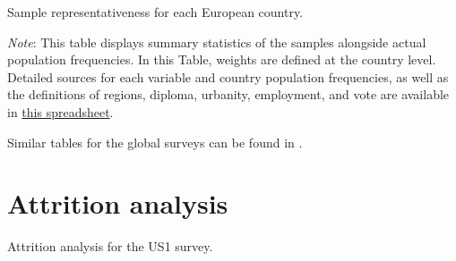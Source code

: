 \begin{table}[h]
    \caption[Sample representativeness of each European country]{Sample representativeness for each European country.} \label{tab:representativeness_EU}
    \makebox[\textwidth][c]{
        \resizebox*{!}{.50\textheight}{%
        
        }
    }
    {\footnotesize \textit{Note}: This table displays summary statistics of the samples alongside actual population frequencies. In this Table, weights are defined at the country level.  %
    Detailed sources for each variable and country population frequencies, as well as the definitions of regions, diploma, urbanity, employment, and vote are available in \href{https://github.com/bixiou/international_attitudes_toward_global_policies/raw/main/questionnaire/specificities.xlsx}{this spreadsheet}. %
    }
\end{table}

Similar tables for the global surveys can be found in \citet{dechezlepretre_fighting_2022}.

\clearpage
\section{Attrition analysis}\label{app:attrition}

\begin{table}[h]\label{tab:attrition_US1}
    \caption[Attrition analysis: US1]{Attrition analysis for the US1 survey.} 
    \makebox[\textwidth][c]{
\resizebox*{!}{.73\textheight}{ %
        
        }
    }
    {\footnotesize %
    }
\end{table}

